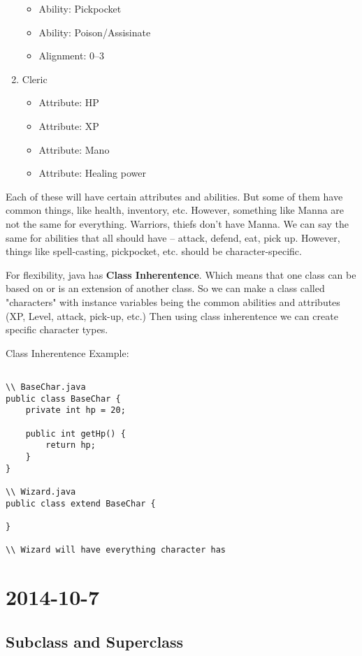 \documentclass [12 pt, twoside] {article}
\begin{document}
\begin{enumerate}
\begin{itemize}
			\item Ability: Pickpocket
			\item Ability: Poison/Assisinate
			\item Alignment: 0--3
		\end{itemize}
	\item Cleric
		\begin{itemize}
			\item Attribute: HP
			\item Attribute: XP
			\item Attribute: Mano
			\item Attribute: Healing power
		\end{itemize}
\end{enumerate}


Each of these will have certain attributes and abilities.
But some of them have common things, like health, inventory, etc.
However, something like Manna are not the same for everything.
Warriors, thiefs don't have Manna.
We can say the same for abilities that all should have -- attack,
defend, eat, pick up. However, things like spell-casting, pickpocket,
etc. should be character-specific.


For flexibility, java has \textbf{Class Inherentence}. Which means
that one class can be based on or is an extension of another class.
So we can make a class called "characters" with instance variables
being the common abilities and attributes (XP, Level, attack, pick-up, 
etc.) Then using class inherentence we can create specific character types.


Class Inherentence Example:
\begin{lstlisting}

\\ BaseChar.java
public class BaseChar {
	private int hp = 20;

	public int getHp() {
		return hp;
	}
}

\\ Wizard.java
public class extend BaseChar {

}

\\ Wizard will have everything character has
\end{lstlisting}


\section{2014-10-7}
\subsection{Subclass and Superclass}
\end{document}
